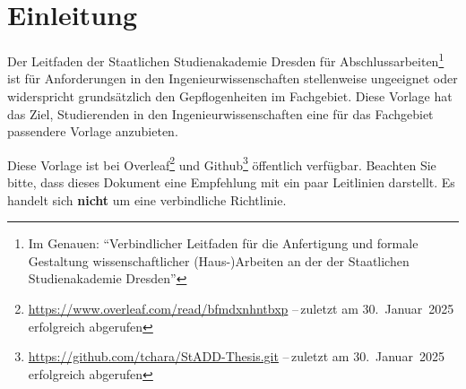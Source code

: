 \chapter{Einleitung}\label{chap:Intro}
Der Leitfaden der Staatlichen Studienakademie Dresden für Abschlussarbeiten\footnote{\label{fn:Leitfaden}Im Genauen: \enquote{Verbindlicher Leitfaden für die Anfertigung und formale Gestaltung wissenschaftlicher (Haus-)Arbeiten an der der Staatlichen Studienakademie Dresden}} ist für Anforderungen in den Ingenieurwissenschaften stellenweise ungeeignet oder widerspricht grundsätzlich den Gepflogenheiten im Fachgebiet. Diese Vorlage hat das Ziel, Studierenden in den Ingenieurwissenschaften eine für das Fachgebiet passendere Vorlage anzubieten.

Diese Vorlage ist bei Overleaf\footnote{\url{https://www.overleaf.com/read/bfmdxnhntbxp} --\,zuletzt am 30.~Januar~2025 erfolgreich abgerufen} und Github\footnote{\url{https://github.com/tchara/StADD-Thesis.git} --\,zuletzt am 30.~Januar~2025 erfolgreich abgerufen} öffentlich verfügbar. Beachten Sie bitte, dass dieses Dokument eine Empfehlung mit ein paar Leitlinien darstellt. Es handelt sich \textbf{nicht} um eine verbindliche Richtlinie.

